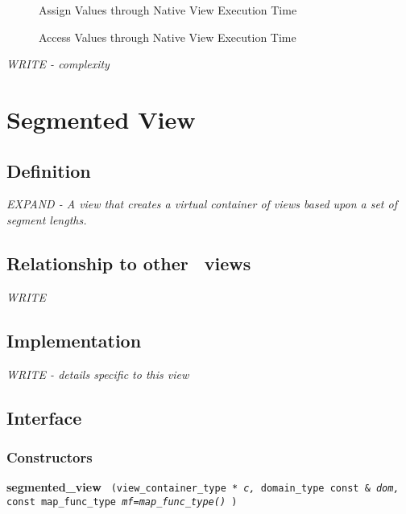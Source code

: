 \begin{figure}[p]
\caption{Assign Values through Native View Execution Time}
\label{fig:nat-vw-assign-exper}
\end{figure}

\begin{figure}[p]
\caption{Access Values through Native View Execution Time}
\label{fig:nat-vw-access-exper}
\end{figure}

\emph{WRITE - complexity}


\section{Segmented View} \label{sec-seg-vw}

\subsection{Definition}

\textit{EXPAND - A view that creates a virtual container of views based upon
a set of segment lengths.}

\subsection{Relationship to other \stapl\ views}

\textit{WRITE}

\subsection{Implementation}

\textit{WRITE - details specific to this view}

\subsection{Interface} \label{sec-seg-vw-inter}

\subsubsection{Constructors}

\noindent
\textbf{segmented\_view}%
\texttt{%
(view\_container\_type *
\textit{c,}%
domain\_type const \&
\textit{dom,}%
const map\_func\_type
\textit{mf=map\_func\_type()}%
)
}

